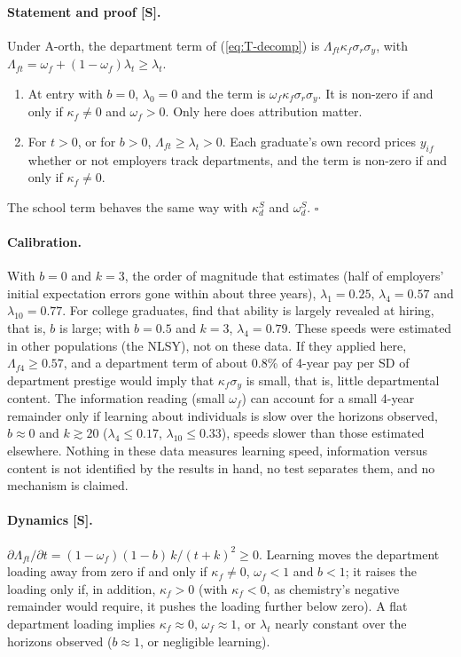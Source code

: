 \documentclass[11pt]{article}
\begin{document}
\paragraph{Statement and proof [S].} Under A-orth, the department term of (\ref{eq:T-decomp}) is
$\Lambda_{ft}\kappa_f\sigma_r\sigma_y$, with $\Lambda_{ft}=\omega_f+(1-\omega_f)\lambda_t\ge\lambda_t$.
\begin{enumerate}
\item[(i)] At entry with $b=0$, $\lambda_0=0$ and the term is $\omega_f\kappa_f\sigma_r\sigma_y$. It is non-zero if
and only if $\kappa_f\neq0$ and $\omega_f>0$. Only here does attribution matter.
\item[(ii)] For $t>0$, or for $b>0$, $\Lambda_{ft}\ge\lambda_t>0$. Each graduate's own record prices $y_{if}$
whether or not employers track departments, and the term is non-zero if and only if $\kappa_f\neq0$.
\end{enumerate}
The school term behaves the same way with $\kappa^S_d$ and $\omega^S_d$. $\square$

\paragraph{Calibration.} With $b=0$ and $k=3$, the order of magnitude that \citet{lange2007speed} estimates (half
of employers' initial expectation errors gone within about three years), $\lambda_1=0.25$, $\lambda_4=0.57$ and
$\lambda_{10}=0.77$. For college graduates, \citet{arcidiacono2010beyond} find that ability is largely revealed at
hiring, that is, $b$ is large; with $b=0.5$ and $k=3$, $\lambda_4=0.79$. These speeds were estimated in other
populations (the NLSY), not on these data. If they applied here, $\Lambda_{f4}\ge0.57$, and a department term of
about 0.8\% of 4-year pay per SD of department prestige would imply that $\kappa_f\sigma_y$ is small, that is,
little departmental content. The information reading (small $\omega_f$) can account for a small 4-year remainder
only if learning about individuals is slow over the horizons observed, $b\approx0$ and $k\gtrsim20$
($\lambda_4\le0.17$, $\lambda_{10}\le0.33$), speeds slower than those estimated elsewhere. Nothing in these data
measures learning speed, information versus content is not identified by the results in hand, no test separates
them, and no mechanism is claimed.

\paragraph{Dynamics [S].} $\partial\Lambda_{ft}/\partial t=(1-\omega_f)(1-b)\,k/(t+k)^2\ge0$. Learning moves the
department loading away from zero if and only if $\kappa_f\neq0$, $\omega_f<1$ and $b<1$; it raises the loading
only if, in addition, $\kappa_f>0$ (with $\kappa_f<0$, as chemistry's negative remainder would require, it pushes
the loading further below zero). A flat department loading implies $\kappa_f\approx0$, $\omega_f\approx1$, or
$\lambda_t$ nearly constant over the horizons observed ($b\approx1$, or negligible learning).
\end{document}
